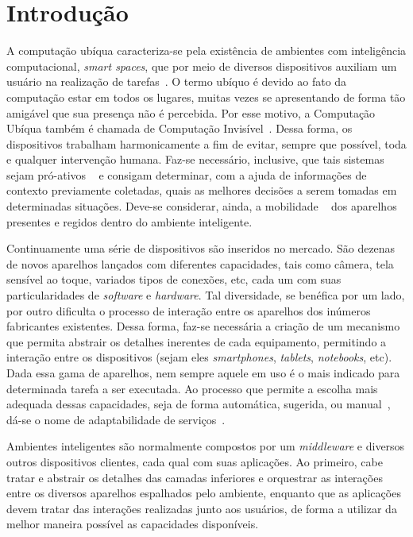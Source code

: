 \chapter{Introdução}

A computação ubíqua caracteriza-se pela existência de ambientes com inteligência computacional, \emph{smart spaces}, que por meio de diversos dispositivos auxiliam um usuário na realização de tarefas~\cite{weiser1993}. O termo ubíquo é devido ao fato da computação estar em todos os lugares, muitas vezes se apresentando de forma tão amigável que sua presença não é percebida. Por esse motivo, a Computação Ubíqua também é chamada de Computação Invisível~\cite{gomes2007, weiser1999}. Dessa forma, os dispositivos trabalham harmonicamente a fim de evitar, sempre que possível, toda e qualquer intervenção humana. Faz-se necessário, inclusive, que tais sistemas sejam pró-ativos ~\cite{gomes2007, buzeto2010} e consigam determinar, com a ajuda de informações de contexto previamente coletadas, quais as melhores decisões a serem tomadas em determinadas situações. Deve-se considerar, ainda, a mobilidade ~\cite{gomes2007, buzeto2010, weiser1999} dos aparelhos presentes e regidos dentro do ambiente inteligente.

Continuamente uma série de dispositivos são inseridos no mercado. São dezenas de novos aparelhos lançados com diferentes capacidades, tais como câmera, tela sensível ao toque, variados tipos de conexões, etc, cada um com suas particularidades de \emph{software} e \emph{hardware}. Tal diversidade, se benéfica por um lado, por outro dificulta o processo de interação entre os aparelhos dos inúmeros fabricantes existentes. Dessa forma, faz-se necessária a criação de um mecanismo que permita abstrair os detalhes inerentes de cada equipamento, permitindo a interação entre os dispositivos (sejam eles \emph{smartphones}, \emph{tablets}, \emph{notebooks}, etc). Dada essa gama de aparelhos, nem sempre aquele em uso é o mais indicado para determinada tarefa a ser executada. Ao processo que permite a escolha mais adequada dessas capacidades, seja de forma automática, sugerida, ou manual~\cite{lucas2011}, dá-se o nome de adaptabilidade de serviços~\cite{adaptabilidadeDeServicos}.

Ambientes inteligentes são normalmente compostos por um \emph{middleware} e diversos outros dispositivos clientes, cada qual com suas aplicações. Ao primeiro, cabe tratar e abstrair os detalhes das camadas inferiores e orquestrar as interações entre os diversos aparelhos espalhados pelo ambiente, enquanto que as aplicações devem tratar das interações realizadas junto aos usuários, de forma a utilizar da melhor maneira possível as capacidades disponíveis.

